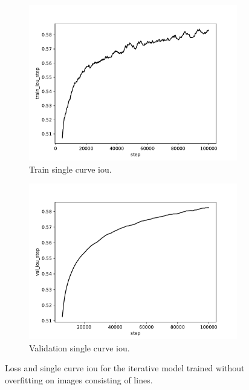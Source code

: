 \begin{figure}
\begin{subfigure}{.45\textwidth}
        \includegraphics[width=\textwidth]{graphics/work-artifacts/iterative/server/135/train_iou_step.pdf}
        \caption{Train single curve \gls{iou}.}
    \end{subfigure}
    \begin{subfigure}{.45\textwidth}
        \includegraphics[width=\textwidth]{graphics/work-artifacts/iterative/server/135/val_iou_step.pdf}
        \caption{Validation single curve \gls{iou}.}
    \end{subfigure}
    \caption{Loss and single curve \gls{iou} for the iterative model trained without overfitting on images consisting of lines.}
    \label{fig:iterative.server.135.metrics}
\end{figure}

